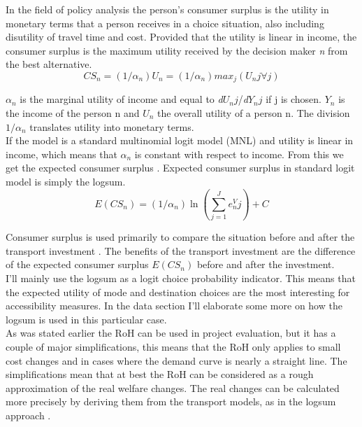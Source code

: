 In the field of policy analysis the person's consumer surplus is the utility in monetary terms that a person receives in a choice situation, also including disutility of travel time and cost. Provided that the utility is linear in income, the consumer surplus is the maximum utility received by the decision maker \textit{n} from the best alternative\citep{logsum}. 
\begin{equation}
CS_n = (1/\alpha_n) U_n = (1/\alpha_n) max_j (U_nj \forall j)
\end{equation}

$\alpha_n$ is the marginal utility of income and equal to \textit{d}$U_nj$/\textit{d}$Y_nj$ if j is chosen. $Y_n$ is the income of the person n and $U_n$ the overall utility of a person n. The division $1/\alpha_n$ translates utility into monetary terms. \\

If the model is a standard multinomial logit model (MNL) and utility is linear in income, which means that $\alpha_n$ is constant with respect to income. From this we get the expected consumer surplus \citep{logsum}. Expected consumer surplus in standard logit model is simply the logsum.
\begin{equation}
E(CS_n)= (1/\alpha_n)\ln(\sum_{j=1}^{J}e^V_nj) +C
\end{equation}

Consumer surplus is used primarily to compare the situation before and after the transport investment \citep{logsum}. The benefits of the transport investment are the difference of the expected consumer surplus $E(CS_n)$ before and after the investment. \\

I'll mainly use the logsum as a logit choice probability indicator. This means that the expected utility of mode and destination choices are the most interesting for accessibility measures. In the data section I'll elaborate some more on how the logsum is used in this particular case. \\

As was stated earlier the RoH can be used in project evaluation, but it has a couple of major simplifications, this means that the RoH only applies to small cost changes and in cases where the demand curve is nearly a straight line. The simplifications mean that at best the RoH can be considered as a rough approximation of the real welfare changes. The real changes can be calculated more precisely by deriving them from the transport models, as in the logsum approach \citep{logsum}. \\

